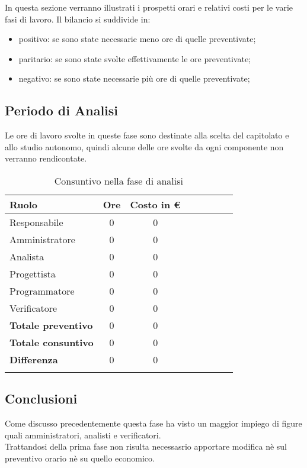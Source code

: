 \documentclass[../piano_di_progetto.tex]{subfiles}
\begin{document}
In questa sezione verranno illustrati i prospetti orari e relativi costi per le varie fasi di lavoro. Il bilancio si suddivide in:
\begin{itemize}
\item positivo: se sono state necessarie meno ore di quelle preventivate;
\item paritario: se sono state svolte effettivamente le ore preventivate;
\item negativo: se sono state necessarie più ore di quelle preventivate;
\end{itemize}

\subsection{ Periodo di Analisi}%
\label{sub:cons_analisi}
Le ore di lavoro svolte in queste fase sono destinate alla scelta del capitolato e allo studio autonomo, quindi alcune delle ore svolte da ogni componente non verranno rendicontate.

\begin{center}
	\begin{longtable}{|l|c|c|c|c|c|c|c|}
		\hline
		\rowcolor{lightgray}
		\textbf{Ruolo} & \textbf{Ore} & \textbf{Costo in €}\\

		\hline
		Responsabile & 0 & 0 \\
		\hline
		Amministratore & 0 & 0\\
		\hline
		Analista & 0 & 0\\
		\hline
		Progettista & 0 & 0\\
		\hline
		Programmatore & 0 & 0\\
		\hline
		Verificatore & 0 & 0\\
		\hline
		\textbf{Totale preventivo} & 0 & 0\\
		\hline
		\textbf{Totale consuntivo} & 0 & 0\\
		\hline
		\textbf{Differenza} & 0 & 0\\
		\hline	

		\caption{Consuntivo nella fase di analisi}
	\end{longtable}
\end{center}

\subsection{ Conclusioni}%
\label{sub:cons_fine}
Come discusso precedentemente questa fase ha visto un maggior impiego di figure quali amministratori, analisti e verificatori.\\
Trattandosi della prima fase non risulta necessasrio apportare modifica nè sul preventivo orario nè su quello economico. 
\end{document}

